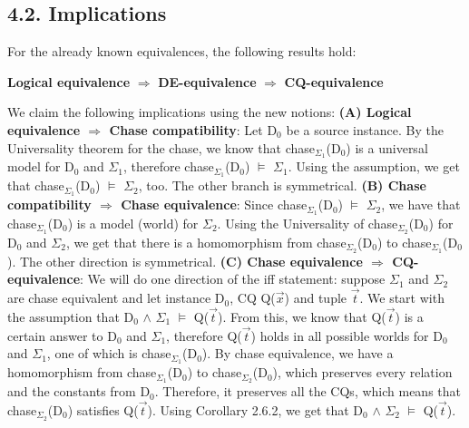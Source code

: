 \documentclass[11pt, a4paper, dvipsnames]{article}
\begin{document}
\subsection{4.2. Implications}
For the already known equivalences, the following results hold:
\begin{center}
\textbf{Logical equivalence} $\Rightarrow$ \textbf{DE-equivalence} $\Rightarrow$ \textbf{CQ-equivalence}
\end{center}
We claim the following implications using the new notions:\newline
\textbf{(A) Logical equivalence $\Rightarrow$ Chase compatibility}:\newline
Let D$_{0}$ be a source instance. By the Universality theorem for the chase, we know that chase$_{\Sigma_{1}}$(D$_{0}$) is a universal model for D$_{0}$ and $\Sigma_{1}$, therefore chase$_{\Sigma_{1}}$(D$_{0}$) $\vDash$ $\Sigma_{1}$. Using the assumption, we get that chase$_{\Sigma_{1}}$(D$_{0}$) $\vDash$ $\Sigma_{2}$, too. The other branch is symmetrical.\newline
\textbf{(B) Chase compatibility $\Rightarrow$ Chase equivalence}:\newline
Since chase$_{\Sigma_{1}}$(D$_{0}$) $\vDash$ $\Sigma_{2}$, we have that chase$_{\Sigma_{1}}$(D$_{0}$) is a model (world) for $\Sigma_{2}$. Using the Universality of chase$_{\Sigma_{2}}$(D$_{0}$) for D$_{0}$ and $\Sigma_{2}$, we get that there is a homomorphism from chase$_{\Sigma_{2}}$(D$_{0}$) to chase$_{\Sigma_{1}}$(D$_{0}$). The other direction is symmetrical.\newline
\textbf{(C) Chase equivalence $\Rightarrow$ CQ-equivalence}:\newline
We will do one direction of the iff statement: suppose $\Sigma_{1}$ and $\Sigma_{2}$ are chase equivalent and let instance D$_{0}$, CQ Q($\vec{x}$) and tuple $\vec{t}$. We start with the assumption that D$_{0}$ $\wedge$ $\Sigma_{1}$ $\vDash$ Q($\vec{t}$). From this, we know that Q($\vec{t}$) is a certain answer to D$_{0}$ and $\Sigma_{1}$, therefore Q($\vec{t}$) holds in all possible worlds for D$_{0}$ and $\Sigma_{1}$, one of which is chase$_{\Sigma_{1}}$(D$_{0}$). By chase equivalence, we have a homomorphism
from chase$_{\Sigma_{1}}$(D$_{0}$) to chase$_{\Sigma_{2}}$(D$_{0}$), which preserves every relation and the constants from D$_{0}$. Therefore, it preserves all the CQs, which means that chase$_{\Sigma_{2}}$(D$_{0}$) satisfies Q($\vec{t}$). Using Corollary 2.6.2, we get that D$_{0}$ $\wedge$ $\Sigma_{2}$ $\vDash$ Q($\vec{t}$).\newline
\end{document}
